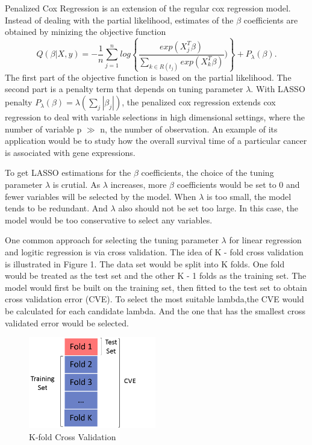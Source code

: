 \documentclass{article}\usepackage[]{graphicx}\usepackage[]{color}
\begin{document}
Penalized Cox Regression is an extension of the regular cox regression model. Instead of dealing with the partial likelihood, estimates of the $\beta$ coefficients are obtained by minizing the objective function \begin{equation}  Q(\beta |X, y) = - \frac{1}{n}  \sum_{j=1}^{n} log \left \{\frac{exp ( X_{j}^{T} \beta)}{\sum_{ k \in R(t_{j})}exp ( X_{k}^{T} \beta)}) \right \} + P_{\lambda}(\beta). \end{equation} The first part of the objective function is based on the partial likelihood. The second part is a penalty term that depends on tuning parameter $\lambda$. With LASSO penalty $P_{\lambda}(\beta) = \lambda (\sum_{j} |\beta_{j}|)$, the penalized cox regression extends cox regression to deal with variable selections in high dimensional settings, where the number of variable p $\gg$ n, the number of observation. An example of its application would be to study how the overall survival time of a particular cancer is associated with gene expressions.

To get LASSO estimations for the $\beta$ coefficients, the choice of the tuning parameter $\lambda$ is crutial. As $\lambda$ increases, more $\beta$ coefficients would be set to 0 and fewer variables will be selected by the model. When $\lambda$ is too small, the model tends to be redundant. And $\lambda$ also should not be set too large. In this case, the model would be too conservative to select any variables.

One common approach for selecting the tuning parameter $\lambda$ for linear regression and logitic regression is via cross validation. The idea of K - fold cross validation is illustrated in Figure 1. The data set would be split into K folds. One fold would be treated as the test set and the other K - 1 folds as the training set. The model would first be built on the training set, then fitted to the test set to obtain cross validation error (CVE). To select the most suitable lambda,the CVE would be calculated for each candidate lambda. And the one that has the smallest cross validated error would be selected.

\begin{figure}
    \centering
		\includegraphics[height= 4cm ]{./figures/cv.png}	
    \caption{K-fold Cross Validation}
\end{figure}	
\end{document}
